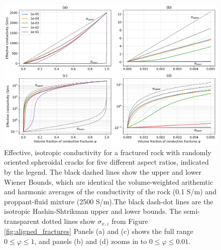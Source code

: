 \begin{figure}
    \begin{center}
    \includegraphics[width=\columnwidth]{figures/phys_prop_model/random_fractures.png}
    \end{center}
\caption{
    Effective, isotropic conductivity for a fractured rock with randomly oriented spheroidal
    cracks for five different aspect ratios, indicated by the legend. The black dashed lines show the upper and lower
    Wiener Bounds, which are identical the volume-weighted arithemtic and harmonic averages of the
    conductivity of the rock (0.1 S/m) and proppant-fluid mixture (2500 S/m).The black dash-dot lines
    are the isotropic Hashin-Shtrikman upper and lower bounds.
    The semi-transparent dotted lines show $\sigma_{x, z}$ from Figure \ref{fig:aligned_fractures}
    Panels (a) and (c) shows the
    full range $0 \leq \varphi \leq 1$, and panels (b) and (d) zooms in to $0 \leq \varphi \leq 0.01$.
}
\label{fig:random_fractures}
\end{figure}
